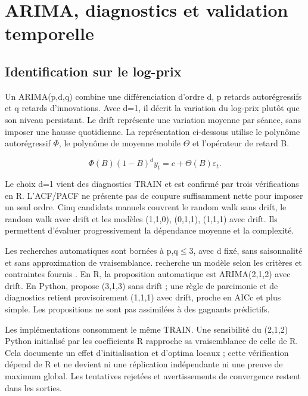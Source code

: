 \section{ARIMA, diagnostics et validation temporelle}\label{sec:arima}

\subsection{Identification sur le log-prix}



Un ARIMA(p,d,q) combine une différenciation d’ordre d, p retards autorégressifs et q retards d’innovations. Avec d=1, il décrit la variation du log-prix plutôt que son niveau persistant. Le drift représente une variation moyenne par séance, sans imposer une hausse quotidienne. La représentation ci-dessous utilise le polynôme autorégressif \(\Phi\), le polynôme de moyenne mobile \(\Theta\) et l’opérateur de retard B.



\begin{equation}\label{eq:arima} \Phi(B)(1-B)^d y_t=c+\Theta(B)\varepsilon_t.\end{equation}



Le choix d=1 vient des diagnostics TRAIN et est confirmé par trois vérifications  en R. L’ACF/PACF ne présente pas de coupure suffisamment nette pour imposer un seul ordre. Cinq candidats manuels couvrent le random walk sans drift, le random walk avec drift et les modèles (1,1,0), (0,1,1), (1,1,1) avec drift. Ils permettent d’évaluer progressivement la dépendance moyenne et la complexité.



Les recherches automatiques sont bornées à p,q\(\leq\)3, avec d fixé, sans saisonnalité et sans approximation de vraisemblance.  recherche un modèle selon les critères et contraintes fournis \cite{R6}. En R, la proposition automatique est ARIMA(2,1,2) avec drift. En Python,  propose (3,1,3) sans drift ; une règle de parcimonie et de diagnostics retient provisoirement (1,1,1) avec drift, proche en AICc et plus simple. Les propositions ne sont pas assimilées à des gagnants prédictifs.



Les implémentations consomment le même TRAIN. Une sensibilité du (2,1,2) Python initialisé par les coefficients R rapproche sa vraisemblance de celle de R. Cela documente un effet d’initialisation et d’optima locaux ; cette vérification dépend de R et ne devient ni une réplication indépendante ni une preuve de maximum global. Les tentatives rejetées et avertissements de convergence restent dans les sorties.



